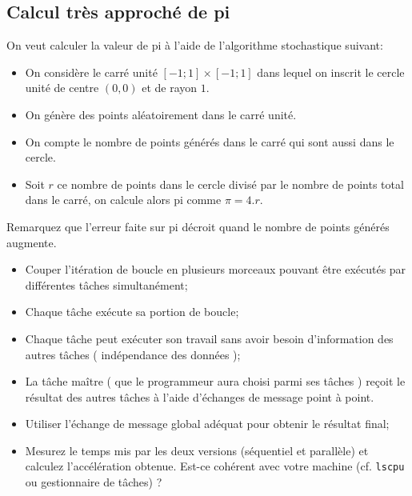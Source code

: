 \documentclass[11pt,a4paper]{article}
\begin{document}
\subsection{Calcul tr\`es approch\'e de pi}

On veut calculer la valeur de pi à l'aide de l'algorithme stochastique suivant:
\begin{itemize}
\item On considère le carré unité
$\left[-1;1\right]\times \left[-1;1\right]$ dans lequel on inscrit le cercle unité de centre $(0,0)$ et de rayon $1$.
\item On génère des points aléatoirement dans le carré unité.
\item On compte le nombre de points générés dans le carré qui sont aussi dans le cercle.
\item Soit $r$ ce nombre de points dans le cercle divisé par le nombre de points
  total dans le carré, on calcule alors pi comme $\pi = 4.r$.
\end{itemize}

Remarquez que l'erreur faite sur pi décroit quand le nombre de points générés augmente.

\begin{center}
\end{center}

\begin{itemize}
\item Couper l'itération de boucle en plusieurs morceaux pouvant être exécutés par différentes tâches
simultanément;
\item Chaque tâche exécute sa portion de boucle;
\item Chaque tâche peut exécuter son travail sans avoir besoin d'information des autres tâches ( indépendance
des données );
\item La tâche maître ( que le programmeur aura choisi parmi ses tâches ) reçoit le résultat des autres
tâches à l'aide d'échanges de message point à point.
\item Utiliser l'échange de message global adéquat pour obtenir le résultat final;
\item Mesurez le temps mis par les deux versions (séquentiel et parallèle) et calculez 
l'accélération obtenue. Est-ce cohérent avec votre machine (cf. \verb|lscpu| ou gestionnaire de tâches) ?
\end{itemize}
\end{document}
